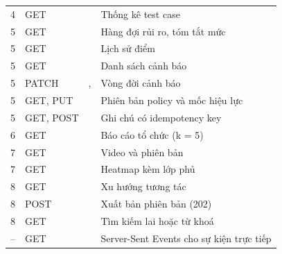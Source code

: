 {\begin{longtable}{@{}L{1.0cm}L{2.1cm}L{7.1cm}L{4.4cm}@{}}
4 & GET &  & Thống kê test case \\
5 & GET &  & Hàng đợi rủi ro, tóm tắt mức \\
5 & GET &  & Lịch sử điểm \\
5 & GET &  & Danh sách cảnh báo \\
5 & PATCH & ,  & Vòng đời cảnh báo \\
5 & GET, PUT &  & Phiên bản policy và mốc hiệu lực \\
5 & GET, POST &  & Ghi chú có idempotency key \\
6 & GET &  & Báo cáo tổ chức (k = 5) \\
7 & GET &  & Video và phiên bản \\
7 & GET &  & Heatmap kèm lớp phủ \\
8 & GET &  & Xu hướng tương tác \\
8 & POST &  & Xuất bản phiên bản (202) \\
8 & GET &  & Tìm kiếm lai hoặc từ khoá \\
-- & GET &  & Server-Sent Events cho sự kiện trực tiếp \\
\bottomrule
\end{longtable}}
